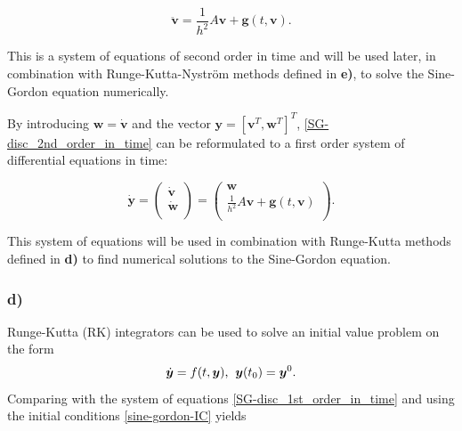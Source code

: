 \begin{equation}
    \label{SG-disc_2nd_order_in_time}
    \boldsymbol{\ddot{v}} = \frac{1}{h^2}A\boldsymbol{v} + \boldsymbol{g}(t, \boldsymbol{v}). %
\end{equation}

\noindent This is a system of equations of second order in time and will be used later, in combination with Runge-Kutta-Nyström methods defined in \textbf{e)}, to solve the Sine-Gordon equation numerically.

By introducing $\boldsymbol{w}=\boldsymbol{\dot{v}}$ and the vector $\boldsymbol{y}=[\boldsymbol{v}^T,\boldsymbol{w}^T]^T$, \eqref{SG-disc_2nd_order_in_time} can be reformulated to a first order system of differential equations in time:

\begin{equation}
    \dot{\boldsymbol{y}} = \begin{pmatrix}
    \boldsymbol{\dot{v}} \\
    \boldsymbol{\dot{w}} \\
    \end{pmatrix}
    = \begin{pmatrix}
    \boldsymbol{w} \\
    \frac{1}{h^2}A\boldsymbol{v} + \boldsymbol{g}(t, \boldsymbol{v})\\
    \end{pmatrix}. %
    \label{SG-disc_1st_order_in_time}
\end{equation}

\noindent This system of equations will be used in combination with Runge-Kutta methods defined in \textbf{d)} to find numerical solutions to the Sine-Gordon equation.

\subsubsection*{d)}
Runge-Kutta (RK) integrators can be used to solve an initial value problem on the form
\begin{equation}
    \dot{\boldsymbol{y}} = f(t,\boldsymbol{y}) \text{,} \hspace{2mm} \boldsymbol{y}(t_0) = \boldsymbol{y}^0. \nonumber
\end{equation}
Comparing with the system of equations \eqref{SG-disc_1st_order_in_time} and using the initial conditions \eqref{sine-gordon-IC} yields

